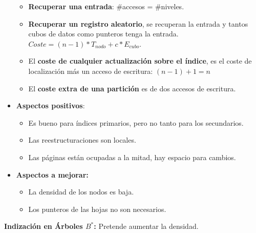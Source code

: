 \documentclass[12pt, twoside, openright]{report} %
\begin{document}
\begin{itemize}
    \begin{itemize}
    \item \textbf{Recuperar una entrada}: \#accesos = \#niveles.
      
    \item \textbf{Recuperar un registro aleatorio}, se recuperan la entrada
      y tantos cubos de datos como punteros tenga la entrada. $Coste= (n-1)*T_{nodo} + c*E_{cubo}$.
      
    \item El \textbf{coste de cualquier actualización sobre el índice}, es
      el coste de localización más un acceso de escritura: $(n-1) +1 = n$
      
    \item El \textbf{coste extra de una partición} es de dos accesos de
      escritura.
      
    \end{itemize}
  \item \textbf{Aspectos positivos}:
    

    \begin{itemize}
    \item Es bueno para índices primarios, pero no tanto para los
      secundarios.
      
    \item Las reestructuraciones son locales.
      
    \item Las páginas están ocupadas a la mitad, hay espacio para cambios.
      
    \end{itemize}
  \item \textbf{Aspectos a mejorar:}
    

    \begin{itemize}
    \item La densidad de los nodos es baja.
      
    \item Los punteros de las hojas no son necesarios.
      
    \end{itemize}
  \end{itemize}

  
  \textbf{Indización en Árboles $B^*$:} Pretende aumentar la densidad.
  
\end{document}
